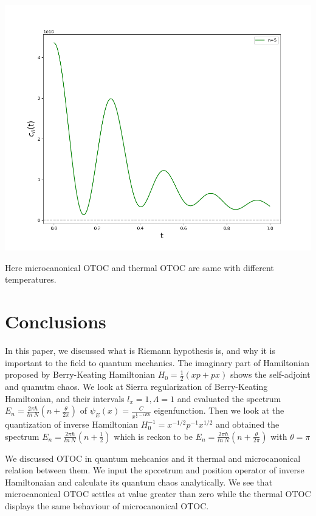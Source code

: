 \documentclass[12pt]{report}
\newcommand*{\1}{\hspace{1pt}}
\begin{document}
        \begin{adjustbox}{center,caption={},label={microcanocnial OTOC},nofloat=figure,}
            \includegraphics[width=\textwidth]{pic2}
        \end{adjustbox}

        Here microcanonical OTOC and thermal OTOC are same with different temperatures.

        
        
        \newpage

        \chapter{Conclusions}

        In this paper, we discussed what is Riemann hypothesis is, and why it is important to the field to quantum mechanics. The imaginary part of Hamiltonian proposed by 
        Berry-Keating Hamiltonian $H_{0} = \frac{1}{2}(xp+px)$ shows the self-adjoint and quanutm chaos. We look at Sierra regularization of Berry-Keating Hamiltonian, and 
        their intervals $l_{x}=1, \Lambda=1$ and evaluated the spectrum $E_{n} = \frac{2\pi \hbar}{ln \ N}(n+\frac{\theta}{2\pi})$ of $\psi_{E}(x) = \frac{C}{x^{\frac{1}{2}-iE\hbar}}$
        eigenfunction. Then we look at the quantization of inverse Hamiltonian $H_{0}^{-1} = x^{-1/2}p^{-1}x^{1/2} $ and obtained the spectrum $E_{n} = \frac{2\pi \hbar}{ln \ N}(n+\frac{1}{2})$
        which is reckon to be $E_{n} = \frac{2\pi \hbar}{ln \ N}(n+\frac{\theta}{2\pi})$ with $\theta = \pi$

        We discussed OTOC in quantum mehcanics and it thermal and microcanonical relation between them. We input the spccetrum and position operator of inverse Hamiltonaian 
        and calculate its quantum chaos analytically. We see that microcanonical OTOC settles at value greater than zero while the thermal OTOC displays the same behaviour
        of microcanonical OTOC.
    
    
\end{document}
